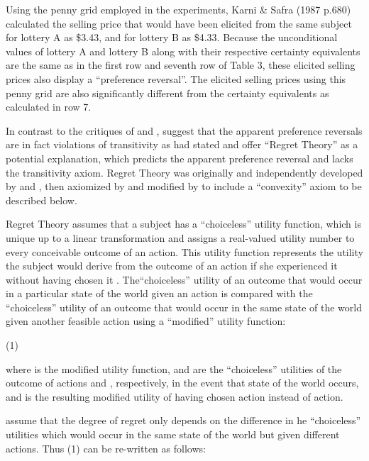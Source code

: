 \documentclass[../main.tex]{subfiles}
\begin{document}
Using the penny grid employed in the \textcite{Grether1979} experiments, Karni \& Safra (1987 p.680)⁠ calculated the selling price that would have been elicited from the same subject for lottery A as \$3.43, and for lottery B as \$4.33.
Because the unconditional values of lottery A and lottery B along with their respective certainty equivalents are the same as in the first row and seventh row of Table 3, these elicited selling prices also display a \enquote{preference reversal}.
The elicited selling prices using this penny grid are also significantly different from the certainty equivalents as calculated in row 7.

In contrast to the critiques of \textcite{Holt1986} and \textcite{Karni1987}, \textcite{Loomes1989} suggest that the apparent preference reversals are in fact violations of transitivity as \textcite[623]{Grether1979} had stated and offer \enquote{Regret Theory} as a potential explanation, which predicts the apparent preference reversal and lacks the transitivity axiom.
Regret Theory was originally and independently developed by \textcite{Loomes1982} and \textcite{Bell1982}, then axiomized by \textcite{Fishburn1987} and modified by \textcite{Loomes1987} to include a \enquote{convexity} axiom to be described below.


Regret Theory assumes that a subject has a \enquote{choiceless} utility function, which is unique up to a linear transformation and assigns a real-valued utility number to every conceivable outcome of an action.
This utility function represents the utility the subject would derive from the outcome of an action if she experienced it without having chosen it \textcite[807]{Loomes1987}.
The\enquote{choiceless} utility of an outcome that would occur in a particular state of the world given an action is compared with the \enquote{choiceless} utility of an outcome that would occur in the same state of the world given another feasible action using a \enquote{modified} utility function:

(1)	

where  is the modified utility function,  and  are the \enquote{choiceless} utilities of the outcome of actions  and , respectively, in the event that state of the world  occurs, and  is the resulting modified utility of having chosen action  instead of action. 

\textcite[809]{Loomes1987} assume that the degree of regret only depends on the difference in  he \enquote{choiceless} utilities which would occur in the same state of the world but given different actions.
Thus (1) can be re-written as follows:
\end{document}
